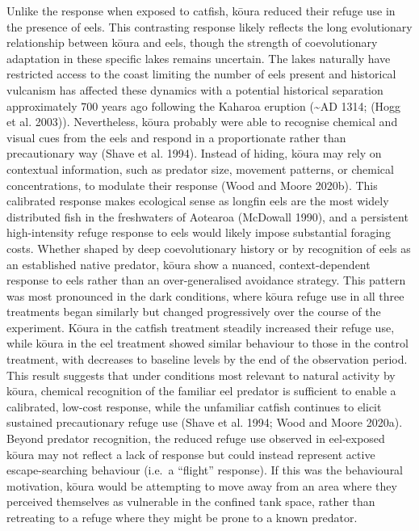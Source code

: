 \documentclass[
  12pt,
  a4paper,
  oneside]{scrbook}
\begin{document}
Unlike the response when exposed to catfish, kōura reduced their refuge
use in the presence of eels. This contrasting response likely reflects
the long evolutionary relationship between kōura and eels, though the
strength of coevolutionary adaptation in these specific lakes remains
uncertain. The lakes naturally have restricted access to the coast
limiting the number of eels present and historical vulcanism has
affected these dynamics with a potential historical separation
approximately 700 years ago following the Kaharoa eruption
(\textasciitilde AD 1314; (Hogg et al. 2003)). Nevertheless, kōura
probably were able to recognise chemical and visual cues from the eels
and respond in a proportionate rather than precautionary way (Shave et
al. 1994). Instead of hiding, kōura may rely on contextual information,
such as predator size, movement patterns, or chemical concentrations, to
modulate their response (Wood and Moore 2020b). This calibrated response
makes ecological sense as longfin eels are the most widely distributed
fish in the freshwaters of Aotearoa (McDowall 1990), and a persistent
high-intensity refuge response to eels would likely impose substantial
foraging costs. Whether shaped by deep coevolutionary history or by
recognition of eels as an established native predator, kōura show a
nuanced, context-dependent response to eels rather than an
over-generalised avoidance strategy. This pattern was most pronounced in
the dark conditions, where kōura refuge use in all three treatments
began similarly but changed progressively over the course of the
experiment. Kōura in the catfish treatment steadily increased their
refuge use, while kōura in the eel treatment showed similar behaviour to
those in the control treatment, with decreases to baseline levels by the
end of the observation period. This result suggests that under
conditions most relevant to natural activity by kōura, chemical
recognition of the familiar eel predator is sufficient to enable a
calibrated, low-cost response, while the unfamiliar catfish continues to
elicit sustained precautionary refuge use (Shave et al. 1994; Wood and
Moore 2020a). Beyond predator recognition, the reduced refuge use
observed in eel-exposed kōura may not reflect a lack of response but
could instead represent active escape-searching behaviour (i.e.~a
``flight'' response). If this was the behavioural motivation, kōura
would be attempting to move away from an area where they perceived
themselves as vulnerable in the confined tank space, rather than
retreating to a refuge where they might be prone to a known predator.
\end{document}
